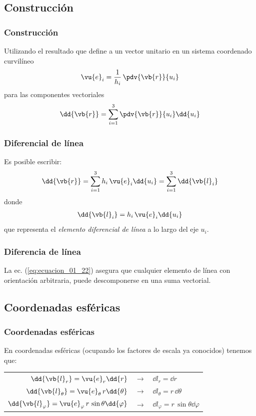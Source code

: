 \subsection{Construcción}
\begin{frame}
\frametitle{Construcción}
Utilizando el resultado que define a un vector unitario en un sistema coordenado curvilíneo
\begin{align*}
\vu{e}_{i} = \dfrac{1}{h_{i}} \, \pdv{\vb{r}}{u_{i}}
\end{align*}
para las componentes vectoriales
\begin{align*}
\dd{\vb{r}} = \sum_{i=1}^{3} \pdv{\vb{r}}{u_{i}} \dd{u_{i}}
\end{align*}
\end{frame}
\begin{frame}
\frametitle{Diferencial de línea}
Es posible escribir:
\begin{align}
\dd{\vb{r}} = \sum_{i=1}^{3} h_{i} \, \vu{e}_{i} \dd{u_{i}} = \sum_{i=1}^{3} \dd{\vb{l}_{i}}
\label{eq:ecuacion_01_21}
\end{align}
\pause
donde
\begin{align}
\dd{\vb{l}_{i}} = h_{i} \, \vu{e}_{i} \dd{u_{i}}
\label{eq:ecuacion_01_22}
\end{align}
que representa el \emph{elemento diferencial de línea} a lo largo del eje $u_{i}$.
\end{frame}
\begin{frame}
\frametitle{Diferencia de línea}
La ec. (\ref{eq:ecuacion_01_22}) asegura que cualquier elemento de línea con orientación arbitraria, puede descomponerse en una suma vectorial.
\end{frame}
\subsection*{Coordenadas esféricas}
\begin{frame}
\frametitle{Coordenadas esféricas}
En coordenadas esféricas (ocupando los factores de escala ya conocidos) tenemos que:
\begin{table}
\begin{tabular}{r  c  l}
$\dd{\vb{l}_{r}} = \vu{e}_{r} \dd{r}$ & $\longrightarrow$ & $\dd{l_{r}} = \dd{r}$ \\
$\dd{\vb{l}_{\theta}} = \vu{e}_{\theta} \, r \dd{\theta}$ & $\longrightarrow$ & $\dd{l_{\theta}} = r \, \dd{\theta}$ \\
$\dd{\vb{l}_{\varphi}} = \vu{e}_{\varphi} \, r \, \sin \theta \dd{\varphi}$ & $\longrightarrow$ & $\dd{l_{\varphi}} = r \, \sin \theta \dd{\varphi}$ \\
\end{tabular}
\end{table}
\end{frame}
